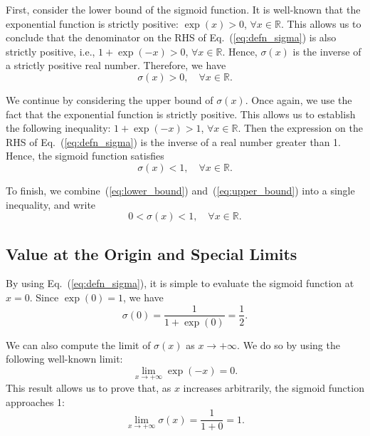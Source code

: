 \documentclass[10pt,american]{scrartcl}
\begin{document}
First, consider the lower bound of the sigmoid function. It is well-known that
the exponential function is strictly positive: $\exp\left(x\right)>0$,
$\forall x\in\mathbb{R}$. This allows us to conclude that the denominator on
the RHS of Eq.~(\ref{eq:defn_sigma}) is also strictly positive, i.e.,
$1+\exp\left(-x\right)>0$, $\forall x\in\mathbb{R}$. Hence,
$\sigma\left(x\right)$ is the inverse of a strictly positive real number.
Therefore, we have
\begin{equation}
\sigma\left(x\right)>0,\quad\forall x\in\mathbb{R}.
\label{eq:lower_bound}
\end{equation}

We continue by considering the upper bound of $\sigma\left(x\right)$. Once
again, we use the fact that the exponential function is strictly positive.
This allows us to establish the following inequality:
$1+\exp\left(-x\right)>1$, $\forall x\in\mathbb{R}$. Then the expression on
the RHS of Eq.~(\ref{eq:defn_sigma}) is the inverse of a real number greater
than 1. Hence, the sigmoid function satisfies
\begin{equation}
\sigma\left(x\right)<1,\quad\forall x\in\mathbb{R}.
\label{eq:upper_bound}
\end{equation}

To finish, we combine~(\ref{eq:lower_bound}) and~(\ref{eq:upper_bound}) into a
single inequality, and write
\begin{equation}
0<\sigma\left(x\right)<1,\quad\forall x\in\mathbb{R}.
\label{eq:sigma_bounds}
\end{equation}

\subsection*{Value at the Origin and Special Limits}

By using Eq.~(\ref{eq:defn_sigma}), it is simple to evaluate the sigmoid
function at $x=0$. Since $\exp\left(0\right)=1$, we have
\begin{equation}
\sigma\left(0\right)=\frac{1}{1+\exp\left(0\right)}=\frac{1}{2}.
\label{eq:sigma_at_origin}
\end{equation}

We can also compute the limit of $\sigma\left(x\right)$ as
$x\rightarrow+\infty$. We do so by using the following well-known limit:
\begin{equation*}
\lim_{x\rightarrow+\infty}\exp\left(-x\right)=0.
\end{equation*}
This result allows us to prove that, as $x$ increases arbitrarily, the sigmoid
function approaches 1:
\begin{equation}
\lim_{x\rightarrow+\infty}\sigma\left(x\right)=\frac{1}{1+0}=1.
\end{equation}
\end{document}

